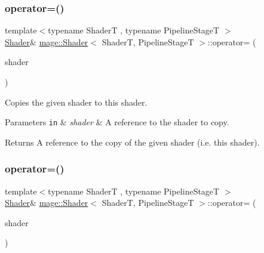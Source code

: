 \subsubsection{\texorpdfstring{operator=()}{operator=()}\hspace{0.1cm}{\footnotesize\ttfamily [1/2]}}
{\footnotesize\ttfamily template$<$typename ShaderT , typename Pipeline\+StageT $>$ \\
\hyperlink{classmage_1_1_shader}{Shader}\& \hyperlink{classmage_1_1_shader}{mage\+::\+Shader}$<$ ShaderT, Pipeline\+StageT $>$\+::operator= (\begin{DoxyParamCaption}\item[{const \hyperlink{classmage_1_1_shader}{Shader}$<$ ShaderT, Pipeline\+StageT $>$ \&}]{shader }\end{DoxyParamCaption})\hspace{0.3cm}{\ttfamily [delete]}}

Copies the given shader to this shader.


\begin{DoxyParams}[1]{Parameters}
\mbox{\tt in}  & {\em shader} & A reference to the shader to copy. \\
\hline
\end{DoxyParams}
\begin{DoxyReturn}{Returns}
A reference to the copy of the given shader (i.\+e. this shader). 
\end{DoxyReturn}
\hypertarget{classmage_1_1_shader_a9f1d94db7a9d62bace24e065e68192bf}{}\label{classmage_1_1_shader_a9f1d94db7a9d62bace24e065e68192bf} 
\subsubsection{\texorpdfstring{operator=()}{operator=()}\hspace{0.1cm}{\footnotesize\ttfamily [2/2]}}
{\footnotesize\ttfamily template$<$typename ShaderT , typename Pipeline\+StageT $>$ \\
\hyperlink{classmage_1_1_shader}{Shader}\& \hyperlink{classmage_1_1_shader}{mage\+::\+Shader}$<$ ShaderT, Pipeline\+StageT $>$\+::operator= (\begin{DoxyParamCaption}\item[{\hyperlink{classmage_1_1_shader}{Shader}$<$ ShaderT, Pipeline\+StageT $>$ \&\&}]{shader }\end{DoxyParamCaption})\hspace{0.3cm}{\ttfamily [delete]}}

